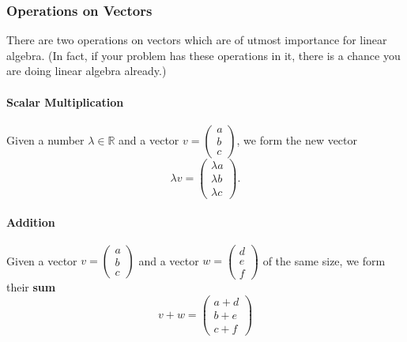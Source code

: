 \documentclass[10pt,]{book}
\newcommand{\terminology}[1]{\textbf{#1}}
\theoremstyle{plain}
\numberwithin{equation}{section}
\begin{document}
\typeout{************************************************}
\typeout{************************************************}
\subsubsection[Operations on Vectors]{Operations on Vectors}\label{subsubsection-1}
There are two operations on vectors which are of utmost importance for linear algebra. (In fact, if your problem has these operations in it, there is a chance you are doing linear algebra already.)%
\typeout{************************************************}
\typeout{************************************************}
\paragraph[Scalar Multiplication]{Scalar Multiplication}\label{paragraph-1}
Given a number \(\lambda \in \mathbb{R}\) and a vector \(v = \left(\begin{smallmatrix} a \\ b \\ c \end{smallmatrix}\right)\), we form the new vector \[\lambda v = \left(\begin{smallmatrix} \lambda a \\ \lambda b \\ \lambda c \end{smallmatrix}\right).\]%
\typeout{************************************************}
\typeout{************************************************}
\paragraph[Addition]{Addition}\label{paragraph-2}
Given a vector \(v = \left(\begin{smallmatrix} a \\ b \\ c \end{smallmatrix}\right)\) and a vector \(w = \left(\begin{smallmatrix} d \\ e \\ f \end{smallmatrix}\right)\) of the same size, we form their \terminology{sum} \[ v+w = \left(\begin{smallmatrix} a+d \\ b+e \\ c+f \end{smallmatrix}\right) \]%
\typeout{************************************************}
\typeout{************************************************}
\end{document}
